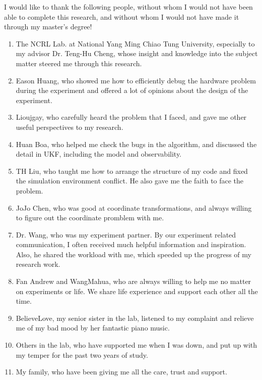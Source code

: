 \normalsize 
I would like to thank the following people, without whom I would not have been able to complete this research, and without whom I would not have made it through my master's degree!
\begin{enumerate}
  \item The NCRL Lab. at National Yang Ming Chiao Tung University, especially to my advisor Dr. Teng-Hu Cheng, whose insight and knowledge into the subject matter steered me through this research.
  \item Eason Huang, who showed me how to efficiently debug the hardware problem during the experiment and offered a lot of opinions about the design of the experiment.
  \item Lioujgay, who carefully heard the problem that I faced, and gave me other useful perspectives to my research.
  \item Huan Boa, who helped me check the bugs in the algorithm, and discussed the detail in UKF, including the model and observability.
  \item TH Liu, who taught me how to arrange the structure of my code and fixed the simulation environment conflict. He also gave me the faith to face the problem.
  \item JoJo Chen, who was good at coordinate transformations, and always willing to figure out the coordinate promblem with me.
  \item Dr. Wang, who was my experiment partner. By our experiment related communication, I often received much helpful information and inspiration. Also, he shared the workload with me, which speeded up the progress of my research work.
  \item Fan Andrew and WangMahua, who are always willing to help me no matter on experiments or life. We share life experience and support each other all the time.
  \item BelieveLove, my senior sister in the lab, listened to my complaint and relieve me of my bad mood by her fantastic piano music.
  \item Others in the lab, who have supported me when I was down, and put up with my temper for the past two years of study.
  \item My family, who have been giving me all the care, trust and support.
\end{enumerate}